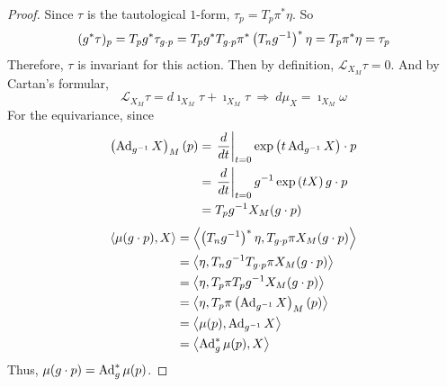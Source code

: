 \documentclass[a4paper,12pt]{article}
\begin{document}
\begin{exam}
\begin{proof}
			Since $\tau$ is the tautological $1$-form, $\tau_p = T_p\pi^*\eta$. So
			\begin{equation*}
				(g^*\tau)_p = T_pg^* \tau_{g \cdot p} = T_pg^*  T_{g \cdot p}\pi^* \left(T_ng^{-1}\right)^*\eta = T_{p}\pi^*\eta = \tau_p
			\end{equation*}
			Therefore, $\tau$ is invariant for this action. Then by definition, $\mathcal{L}_{X_M}\tau = 0$. And by Cartan's formular,
			\begin{equation*}
				\mathcal{L}_{X_M}\tau =  d\imath_{X_M}\tau + \imath_{X_M}\tau~\Rightarrow~ d\mu_X = \imath_{X_M}\omega
			\end{equation*}
			For the equivariance, since
			\begin{equation*}
				\begin{split}
					\left(\operatorname{Ad}_{g^{-1}}X\right)_M(p) &= \left.\frac{d}{dt}\right\lvert_{t=0} \exp\left(t\operatorname{Ad}_{g^{-1}}X\right)\cdot p \\ 
					&= \left.\frac{d}{dt}\right\lvert_{t=0} g^{-1}\exp\left(tX\right)g\cdot p \\
					&=  T_pg^{-1}X_M(g\cdot p)
				\end{split}
			\end{equation*}
			\begin{equation*}
				\begin{split}
					\left\langle \mu(g \cdot p),X \right\rangle &= \left\langle \left(T_ng^{-1}\right)^*\eta,T_{g \cdot p}\pi X_M(g \cdot p) \right\rangle \\
					&= \left\langle \eta,T_ng^{-1}T_{g \cdot p}\pi X_M(g \cdot p) \right\rangle \\
					&= \left\langle \eta,T_{p}\pi T_pg^{-1} X_M(g \cdot p) \right\rangle \\
					&= \left\langle \eta,T_{p}\pi \left(\operatorname{Ad}_{g^{-1}}X\right)_M(p) \right\rangle \\
					&= \left\langle \mu(p),\operatorname{Ad}_{g^{-1}}X \right\rangle \\
					&= \left\langle \operatorname{Ad}^*_{g}\mu(p),X \right\rangle
				\end{split}
			\end{equation*}
			Thus, $\mu(g \cdot p) = \operatorname{Ad}_g^*\mu(p)$.
		\end{proof}
	\end{exam}
\end{document}
